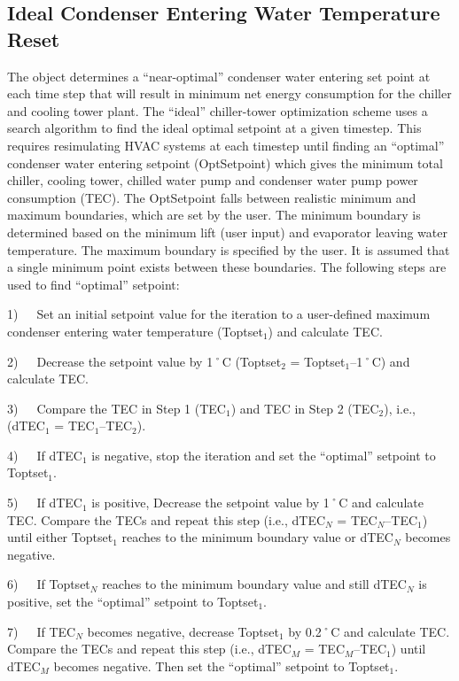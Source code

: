 \subsection{Ideal Condenser Entering Water Temperature Reset}\label{ideal-condenser-entering-water-temperature-reset}

The object determines a ``near-optimal'' condenser water entering set point at each time step that will result in minimum net energy consumption for the chiller and cooling tower plant. The ``ideal'' chiller-tower optimization scheme uses a search algorithm to find the ideal optimal setpoint at a given timestep. This requires resimulating HVAC systems at each timestep until finding an ``optimal'' condenser water entering setpoint (OptSetpoint) which gives the minimum total chiller, cooling tower, chilled water pump and condenser water pump power consumption (TEC). The OptSetpoint falls between realistic minimum and maximum boundaries, which are set by the user. The minimum boundary is determined based on the minimum lift (user input) and evaporator leaving water temperature. The maximum boundary is specified by the user. It is assumed that a single minimum point exists between these boundaries. The following steps are used to find ``optimal'' setpoint:

1)~~~Set an initial setpoint value for the iteration to a user-defined maximum condenser entering water temperature (Toptset\(_{1}\)) and calculate TEC.

2)~~~Decrease the setpoint value by 1˚C (Toptset\(_{2}\) = Toptset\(_{1}\)--1˚C) and calculate TEC.

3)~~~Compare the TEC in Step 1 (TEC\(_{1}\)) and TEC in Step 2 (TEC\(_{2}\)), i.e., (dTEC\(_{1}\) = TEC\(_{1}\)--TEC\(_{2}\)).

4)~~~If dTEC\(_{1}\) is negative, stop the iteration and set the ``optimal'' setpoint to Toptset\(_{1}\).

5)~~~If dTEC\(_{1}\) is positive, Decrease the setpoint value by 1˚C and calculate TEC. Compare the TECs and repeat this step (i.e., dTEC\(_{N}\) = TEC\(_{N}\)--TEC\(_{1}\)) until either Toptset\(_{1}\) reaches to the minimum boundary value or dTEC\(_{N}\) becomes negative.

6)~~~If Toptset\(_{N}\) reaches to the minimum boundary value and still dTEC\(_{N}\) is positive, set the ``optimal'' setpoint to Toptset\(_{1}\).

7)~~~If TEC\(_{N}\) becomes negative, decrease Toptset\(_{1}\) by 0.2˚C and calculate TEC. Compare the TECs and repeat this step (i.e., dTEC\(_{M}\) = TEC\(_{M}\)--TEC\(_{1}\)) until dTEC\(_{M}\) becomes negative. Then set the ``optimal'' setpoint to Toptset\(_{1}\).

